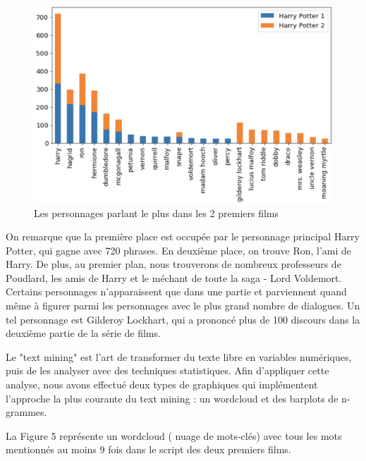 \documentclass[11pt]{article}
\begin{document}
\begin{figure}[hbt!]
    \centering
    \includegraphics[width= 13cm, height= 8 cm]{./figures/most.png}
    \caption{Les personnages parlant le plus dans les 2 premiers films}
\end{figure}
\FloatBarrier

On remarque que la première place est occupée par le personnage principal Harry Potter, qui gagne avec 720 phrases. En deuxième place, on trouve Ron, l'ami de Harry. De plus, au premier plan, nous trouverons de nombreux professeurs de Poudlard, les amis de Harry et le méchant de toute la saga - Lord Voldemort. Certains personnages n'apparaissent que dans une partie et parviennent quand même à figurer parmi les personnages avec le plus grand nombre de dialogues. Un tel personnage est Gilderoy Lockhart, qui a prononcé plus de 100 discours dans la deuxième partie de la série de films.\par

Le "text mining" est l'art de transformer du texte libre en variables numériques, puis de les analyser avec des techniques statistiques. Afin d'appliquer cette analyse, nous avons effectué deux types de graphiques qui implémentent l'approche la plus courante du text mining : un wordcloud et des barplots de n-grammes.\par

La Figure 5 représente un wordcloud ( nuage de mots-clés) avec tous les mots mentionnés au moins 9 fois dans le script des deux premiers films.
\end{document}
